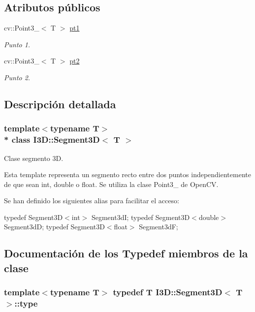\subsection*{Atributos públicos}
\begin{DoxyCompactItemize}
\item 
cv\+::\+Point3\+\_\+$<$ T $>$ \hyperlink{class_i3_d_1_1_segment3_d_af9ee76f2e2b78d61ef8ea044bb47fe21}{pt1}
\begin{DoxyCompactList}\small\item\em Punto 1. \end{DoxyCompactList}\item 
cv\+::\+Point3\+\_\+$<$ T $>$ \hyperlink{class_i3_d_1_1_segment3_d_a91b9feb55271c1b1cbe6be0254904e21}{pt2}
\begin{DoxyCompactList}\small\item\em Punto 2. \end{DoxyCompactList}\end{DoxyCompactItemize}


\subsection{Descripción detallada}
\subsubsection*{template$<$typename T$>$\\*
class I3\+D\+::\+Segment3\+D$<$ T $>$}

Clase segmento 3D. 

Esta template representa un segmento recto entre dos puntos independientemente de que sean int, double o float. Se utiliza la clase Point3\+\_\+ de Open\+CV.

Se han definido los siguientes alias para facilitar el acceso\+:

typedef Segment3\+D$<$int$>$ Segment3dI; typedef Segment3\+D$<$double$>$ Segment3dD; typedef Segment3\+D$<$float$>$ Segment3dF; 

\subsection{Documentación de los \textquotesingle{}Typedef\textquotesingle{} miembros de la clase}
\subsubsection[{\texorpdfstring{type}{type}}]{\setlength{\rightskip}{0pt plus 5cm}template$<$typename T$>$ typedef T {\bf I3\+D\+::\+Segment3D}$<$ T $>$\+::{\bf type}}\hypertarget{class_i3_d_1_1_segment3_d_a367ef41bf0a1e329a4363fe5e3731612}{}\label{class_i3_d_1_1_segment3_d_a367ef41bf0a1e329a4363fe5e3731612}



